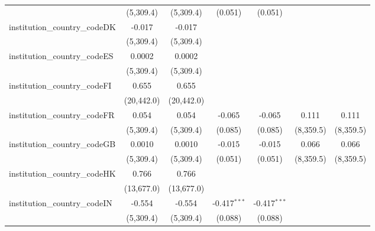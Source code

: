 \begin{tabular}{lcccccc}
                                         & (5,309.4)     & (5,309.4)     & (0.051)        & (0.051)        &                &   \\   
   institution\_country\_codeDK          & -0.017        & -0.017        &                &                &                &   \\   
                                         & (5,309.4)     & (5,309.4)     &                &                &                &   \\   
   institution\_country\_codeES          & 0.0002        & 0.0002        &                &                &                &   \\   
                                         & (5,309.4)     & (5,309.4)     &                &                &                &   \\   
   institution\_country\_codeFI          & 0.655         & 0.655         &                &                &                &   \\   
                                         & (20,442.0)    & (20,442.0)    &                &                &                &   \\   
   institution\_country\_codeFR          & 0.054         & 0.054         & -0.065         & -0.065         & 0.111          & 0.111\\   
                                         & (5,309.4)     & (5,309.4)     & (0.085)        & (0.085)        & (8,359.5)      & (8,359.5)\\   
   institution\_country\_codeGB          & 0.0010        & 0.0010        & -0.015         & -0.015         & 0.066          & 0.066\\   
                                         & (5,309.4)     & (5,309.4)     & (0.051)        & (0.051)        & (8,359.5)      & (8,359.5)\\   
   institution\_country\_codeHK          & 0.766         & 0.766         &                &                &                &   \\   
                                         & (13,677.0)    & (13,677.0)    &                &                &                &   \\   
   institution\_country\_codeIN          & -0.554        & -0.554        & -0.417$^{***}$ & -0.417$^{***}$ &                &   \\   
                                         & (5,309.4)     & (5,309.4)     & (0.088)        & (0.088)        &                &   \\   

\end{tabular}
